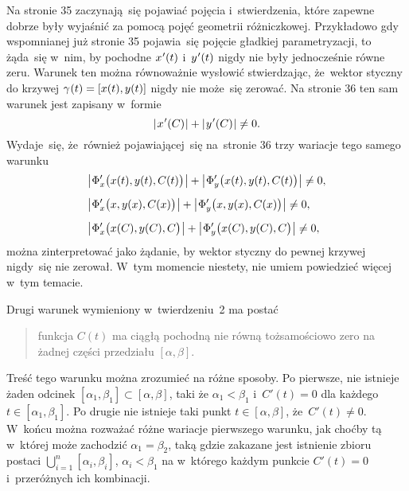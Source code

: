 \documentclass[a4paper,11pt]{article}
\numberwithin{equation}{section}
\begin{document}
\noindent
{} Na stronie 35 zaczynają~się pojawiać pojęcia
i~stwierdzenia, które zapewne dobrze były wyjaśnić za pomocą pojęć geometrii
różniczkowej. Przykładowo gdy wspomnianej już stronie 35 pojawia~się
pojęcie gładkiej parametryzacji, to żąda~się w~nim, by pochodne
$x \hspace{0.05em} '( t )$ i~$y \hspace{0.05em} '( t )$ nigdy nie były
jednocześnie równe zeru. Warunek ten można równoważnie wysłowić
stwierdzając, że~wektor styczny do krzywej
$\gamma \hspace{0.05em} ( t ) = [ x( t ), y( t ) ]$ nigdy nie może~się zerować.
Na stronie 36 ten sam warunek jest zapisany w~formie
\begin{equation}
  \label{eq:Uwagi-do-konkrentych-stron-71}
  | \hspace{0.075em}  x \hspace{0.05em} '( C )  \hspace{0.05em} | +
  | \hspace{0.075em}  y \hspace{0.05em} '( C )  \hspace{0.05em} | \neq 0.
\end{equation}
Wydaje~się, że~również pojawiającej~się na~stronie 36 trzy wariacje
tego samego warunku
\begin{align}
  \label{eq:Uwagi-do-konkrentych-stron-72-A}
  &\big| \hspace{0.05em}  \Phi_{ x }'\big( x( t ), y( t ), C( t ) \big)  \hspace{0.05em} \big| +
    \big| \hspace{0.05em}  \Phi_{ y }'\big( x( t ), y( t ), C( t )
    \big)  \hspace{0.05em} \big| \neq 0, \\[0.5em]
  \label{eq:Uwagi-do-konkrentych-stron-72-B}
  &\big| \hspace{0.05em}  \Phi_{ x }'\big( x, y( x ), C( x ) \big)  \hspace{0.05em} \big| +
    \big| \hspace{0.05em}  \Phi_{ y }'\big( x, y( x ), C( x ) \big)  \hspace{0.05em} \big| \neq 0, \\[0.5em]
  \label{eq:Uwagi-do-konkrentych-stron-72-C}
  &\big| \hspace{0.05em}  \Phi_{ x }'\big( x( C ), y( C ), C \big)  \hspace{0.05em} \big| +
    \big| \hspace{0.05em}  \Phi_{ y }'\big( x( C ), y( C ), C \big)  \hspace{0.05em} \big| \neq 0,
\end{align}
można zinterpretować jako żądanie, by wektor styczny do pewnej krzywej
nigdy~się nie zerował. W~tym momencie niestety, nie umiem powiedzieć więcej
w~tym temacie.

\VerSpaceFour





\noindent
{} Drugi warunek wymieniony w~twierdzeniu~2 ma postać


\begin{quote}

  funkcja $C( t )$ ma ciągłą pochodną nie równą tożsamościowo zero na żadnej
  części przedziału $[ \alpha, \beta ]$.

\end{quote}


\noindent
Treść tego warunku można zrozumieć na różne sposoby. Po pierwsze, nie
istnieje żaden odcinek $[ \alpha_{ 1 }, \beta_{ 1 } ] \subset [ \alpha, \beta ]$, taki że
$\alpha_{ 1 } < \beta_{ 1 }$ i~$C'( t ) = 0$ dla każdego $t \in [ \alpha_{ 1 }, \beta_{ 1 } ]$. Po
drugie nie istnieje taki punkt $t \in [ \alpha, \beta ]$, że~$C'( t ) \neq 0$. W~końcu
można rozważać różne wariacje pierwszego warunku, jak choćby tą w~której
może zachodzić $\alpha_{ 1 } = \beta_{ 2 }$, taką gdzie zakazane jest istnienie zbioru
postaci $\bigcup_{ i = 1 }^{ n } [ \alpha_{ i }, \beta_{ i } ]$, $\alpha_{ i } < \beta_{ 1 }$
na w~którego każdym punkcie $C'( t ) = 0$ i~przeróżnych ich kombinacji.
\end{document}
